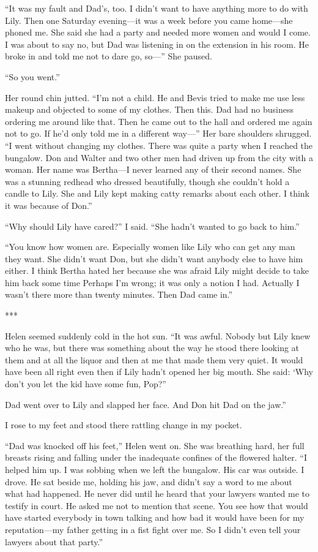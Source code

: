 \documentclass{novel}
\begin{document}
{“It was my fault and Dad’s, too. I didn’t want to have anything more to do with Lily. Then one Saturday evening—it was a week before you came home—she phoned me. She said she had a party and needed more women and would I come. I was about to say no, but Dad was listening in on the extension in his room. He broke in and told me not to dare go, so—” She paused.

“So you went.”

Her round chin jutted. “I’m not a child. He and Bevis tried to make me use less makeup and objected to some of my clothes. Then this. Dad had no business ordering me around like that. Then he came out to the hall and ordered me again not to go. If he’d only told me in a different way—” Her bare shoulders shrugged. “I went without changing my clothes. There was quite a party when I reached the bungalow. Don and Walter and two other men had driven up from the city with a woman. Her name was Bertha—I never learned any of their second names. She was a stunning redhead who dressed beautifully, though she couldn’t hold a candle to Lily. She and Lily kept making catty remarks about each other. I think it was because of Don.”

“Why should Lily have cared?” I said. “She hadn’t wanted to go back to him.”

“You know how women are. Especially women like Lily who can get any man they want. She didn’t want Don, but she didn’t want anybody else to have him either. I think Bertha hated her because she was afraid Lily might decide to take him back some time Perhaps I’m wrong; it was only a notion I had. Actually I wasn’t there more than twenty minutes. Then Dad came in.”

***

Helen seemed suddenly cold in the hot sun. “It was awful. Nobody but Lily knew who he was, but there was something about the way he stood there looking at them and at all the liquor and then at me that made them very quiet. It would have been all right even then if Lily hadn’t opened her big mouth. She said: ‘Why don’t you let the kid have some fun, Pop?”

Dad went over to Lily and slapped her face. And Don hit Dad on the jaw.”

I rose to my feet and stood there rattling change in my pocket.

“Dad was knocked off his feet,” Helen went on. She was breathing hard, her full breasts rising and falling under the inadequate confines of the flowered halter. “I helped him up. I was sobbing when we left the bungalow. His car was outside. I drove. He sat beside me, holding his jaw, and didn’t say a word to me about what had happened. He never did until he heard that your lawyers wanted me to testify in court. He asked me not to mention that scene. You see how that would have started everybody in town talking and how bad it would have been for my reputation—my father getting in a fist fight over me. So I didn’t even tell your lawyers about that party.”

}
\end{document}
